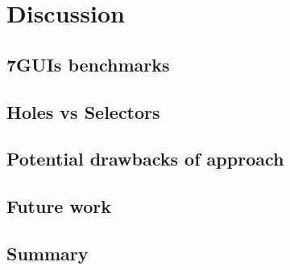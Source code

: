 \chapter{Discussion}
\label{chap:discussion}


\section{7GUIs benchmarks}
\section{Holes vs Selectors}
\section{Potential drawbacks of approach}
\section{Future work}
\section{Summary}
